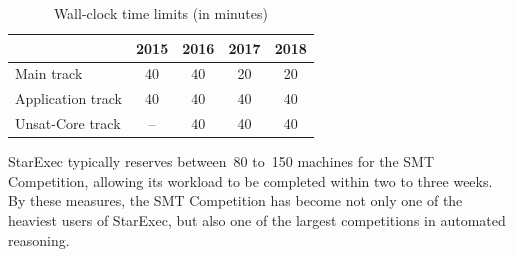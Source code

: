 \documentclass[dvipsnames,table,twoside,11pt]{article}
\begin{document}
\begin{table}
  \caption{Wall-clock time limits (in minutes)}
  \label{table:time-limits}
  \centering
  \begin{tabular}{lcccc}
    \toprule
    & 2015 & 2016 & 2017 & 2018 \\
    \midrule
    Main track        & 40 & 40 & 20\protect\footnotemark & 20 \\
    Application track & 40 & 40 & 40\phantom{$^{1.}$}      & 40 \\
    Unsat-Core track  & -- & 40 & 40\phantom{$^{1.}$}      & 40 \\
    \bottomrule
  \end{tabular}
\end{table}

StarExec typically reserves between~80 to~150 machines for the SMT
Competition, allowing its workload to be completed within two to three
weeks.  By these measures, the SMT Competition has become not only one
of the heaviest users of StarExec, but also one of the largest
competitions in automated reasoning.
\end{document}
